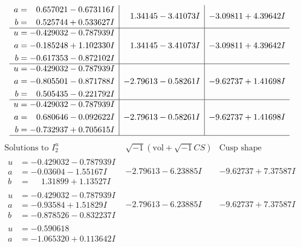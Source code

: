 \documentclass[1p]{elsarticle_modified}
\theoremstyle{definition}
\newcommand{\I}{\sqrt{-1}}
\begin{document}
$$\begin{array}{c|c|c}
\begin{aligned}
a &= \phantom{-}0.657021 - 0.673116 I \\
b &= \phantom{-}0.525744 + 0.533627 I\end{aligned}
 & \phantom{-}1.34145 - 3.41073 I & -3.09811 + 4.39642 I \\ \hline\begin{aligned}
u &= -0.429032 - 0.787939 I \\
a &= -0.185248 + 1.102330 I \\
b &= -0.617353 - 0.872102 I\end{aligned}
 & \phantom{-}1.34145 - 3.41073 I & -3.09811 + 4.39642 I \\ \hline\begin{aligned}
u &= -0.429032 - 0.787939 I \\
a &= -0.805501 - 0.871788 I \\
b &= \phantom{-}0.505435 - 0.221792 I\end{aligned}
 & -2.79613 - 0.58261 I & -9.62737 + 1.41698 I \\ \hline\begin{aligned}
u &= -0.429032 - 0.787939 I \\
a &= \phantom{-}0.680646 - 0.092622 I \\
b &= -0.732937 + 0.705615 I\end{aligned}
 & -2.79613 - 0.58261 I & -9.62737 + 1.41698 I\\
 \hline 
 \end{array}$$\newpage$$\begin{array}{c|c|c}  
\text{Solutions to }I^u_{2}& \I (\text{vol} + \sqrt{-1}CS) & \text{Cusp shape}\\
 \hline 
\begin{aligned}
u &= -0.429032 - 0.787939 I \\
a &= -0.03604 - 1.55167 I \\
b &= \phantom{-}1.31899 + 1.13527 I\end{aligned}
 & -2.79613 - 6.23885 I & -9.62737 + 7.37587 I \\ \hline\begin{aligned}
u &= -0.429032 - 0.787939 I \\
a &= -0.93584 + 1.51829 I \\
b &= -0.878526 - 0.832237 I\end{aligned}
 & -2.79613 - 6.23885 I & -9.62737 + 7.37587 I \\ \hline\begin{aligned}
u &= -0.590618\phantom{ +0.000000I} \\
a &= -1.065320 + 0.113642 I \\

\end{aligned}
\end{array}$$
\end{document}
